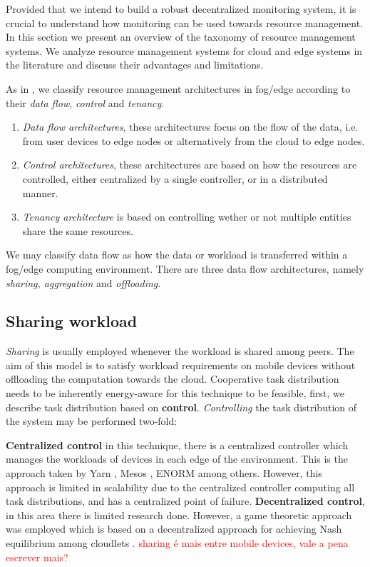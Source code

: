 Provided that we intend to build a robust decentralized monitoring system, it is crucial to understand how monitoring can be used towards resource management. In this section we present an overview of the taxonomy of resource management systems. We analyze resource management systems for cloud and edge systems in the literature and discuss their advantages and limitations.

As in \cite{Hong2019}, we classify resource management architectures in fog/edge according to their \textit{data flow}, \textit{control} and \textit{tenancy}.

\begin{enumerate}

    \item \textit{Data flow architectures}, these architectures focus on the flow of the data, i.e. from user devices to edge nodes or alternatively from the cloud to edge nodes.
    
    \item \textit{Control architectures}, these architectures are based on how the resources are controlled, either centralized by a single controller, or in a distributed manner.
    
    \item \textit{Tenancy architecture} is based on controlling wether or not multiple entities share the same resources.

\end{enumerate}

We may classify data flow as how the data or workload is transferred within a fog/edge computing environment. There are three data flow architectures, namely \textit{sharing, aggregation} and \textit{offloading}.


\subsection{Sharing workload}

\textit{Sharing} is usually employed whenever the workload is shared among peers. The aim of this model is to satisfy workload requirements on mobile devices without offloading the computation towards the cloud. Cooperative task distribution needs to be inherently energy-aware for this technique to be feasible, first, we describe task distribution based on \textbf{control}. \textit{Controlling} the task distribution of the system may be performed two-fold: 

\textbf{Centralized control} in this technique, there is a centralized controller which manages the workloads of devices in each edge of the environment. This is the approach taken by Yarn \cite{Vavilapalli2013ApacheHY} , Mesos \cite{hindman2011mesos}, ENORM \cite{wang2017enorm} among others. However, this approach is limited in scalability due to the centralized controller computing all task distributions, and has a centralized point of failure. \textbf{Decentralized control}, in this area there is limited research done. However, a game theoretic approach was employed which is based on a decentralized  approach for achieving Nash equilibrium among cloudlets \cite{Cui2017}. \textcolor{red}{sharing é mais entre mobile devices, vale a pena escrever mais?}

